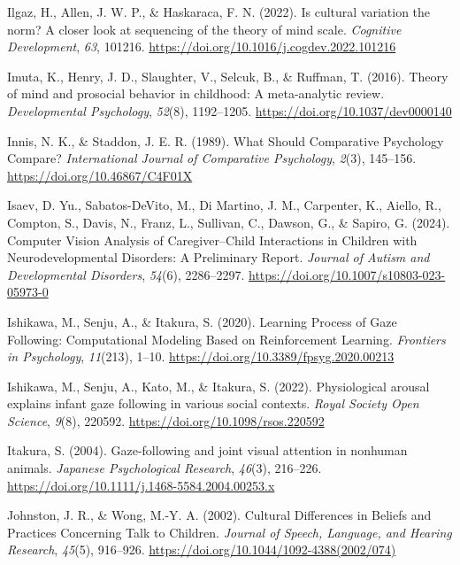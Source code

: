\documentclass[
]{scrbook}
\newlength{\cslhangindent}
\newenvironment{CSLReferences}[2] %
 {\begin{list}{}{%
  \setlength{\itemindent}{0pt}
  \setlength{\leftmargin}{0pt}
  \setlength{\parsep}{0pt}
  \ifodd #1
   \setlength{\leftmargin}{\cslhangindent}
   \setlength{\itemindent}{-1\cslhangindent}
  \fi
  \setlength{\itemsep}{#2\baselineskip}}}
 {\end{list}}
\begin{document}
\begin{CSLReferences}{1}{0}
Ilgaz, H., Allen, J. W. P., \& Haskaraca, F. N. (2022). Is cultural variation the norm? {A} closer look at sequencing of the theory of mind scale. \emph{Cognitive Development}, \emph{63}, 101216. \url{https://doi.org/10.1016/j.cogdev.2022.101216}

Imuta, K., Henry, J. D., Slaughter, V., Selcuk, B., \& Ruffman, T. (2016). Theory of mind and prosocial behavior in childhood: {A} meta-analytic review. \emph{Developmental Psychology}, \emph{52}(8), 1192--1205. \url{https://doi.org/10.1037/dev0000140}

Innis, N. K., \& Staddon, J. E. R. (1989). What {Should Comparative Psychology Compare}? \emph{International Journal of Comparative Psychology}, \emph{2}(3), 145--156. \url{https://doi.org/10.46867/C4F01X}

Isaev, D. Yu., Sabatos-DeVito, M., Di Martino, J. M., Carpenter, K., Aiello, R., Compton, S., Davis, N., Franz, L., Sullivan, C., Dawson, G., \& Sapiro, G. (2024). Computer {Vision Analysis} of {Caregiver}--{Child Interactions} in {Children} with {Neurodevelopmental Disorders}: {A Preliminary Report}. \emph{Journal of Autism and Developmental Disorders}, \emph{54}(6), 2286--2297. \url{https://doi.org/10.1007/s10803-023-05973-0}

Ishikawa, M., Senju, A., \& Itakura, S. (2020). Learning {Process} of {Gaze Following}: {Computational Modeling Based} on {Reinforcement Learning}. \emph{Frontiers in Psychology}, \emph{11}(213), 1--10. \url{https://doi.org/10.3389/fpsyg.2020.00213}

Ishikawa, M., Senju, A., Kato, M., \& Itakura, S. (2022). Physiological arousal explains infant gaze following in various social contexts. \emph{Royal Society Open Science}, \emph{9}(8), 220592. \url{https://doi.org/10.1098/rsos.220592}

Itakura, S. (2004). Gaze-following and joint visual attention in nonhuman animals. \emph{Japanese Psychological Research}, \emph{46}(3), 216--226. \url{https://doi.org/10.1111/j.1468-5584.2004.00253.x}

Johnston, J. R., \& Wong, M.-Y. A. (2002). Cultural {Differences} in {Beliefs} and {Practices Concerning Talk} to {Children}. \emph{Journal of Speech, Language, and Hearing Research}, \emph{45}(5), 916--926. \url{https://doi.org/10.1044/1092-4388(2002/074)}


\end{CSLReferences}
\end{document}
